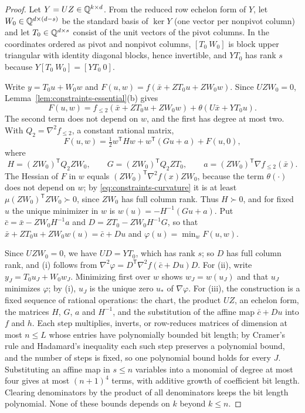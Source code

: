 \begin{proof}
Let $Y=UZ\in\mathbb Q^{k\times d}$. From the reduced row echelon form of $Y$, let
$W_0\in\mathbb Q^{d\times(d-s)}$ be the standard basis of $\ker Y$ (one vector per
nonpivot column) and let $T_0\in\mathbb Q^{d\times s}$ consist of the unit vectors of
the pivot columns. In the coordinates ordered as pivot and nonpivot columns,
$[T_0\ W_0]$ is block upper triangular with identity diagonal blocks, hence
invertible, and $YT_0$ has rank $s$ because $Y[T_0\ W_0]=[YT_0\ 0]$.

Write $y=T_0u+W_0w$ and $F(u,w)=f(\bar x+ZT_0u+ZW_0w)$. Since $UZW_0=0$,
Lemma~\ref{lem:constraints-essential}(b) gives
\[
 F(u,w)=f_{\le2}(\bar x+ZT_0u+ZW_0w)+\theta(U\bar x+YT_0u).
\]
The second term does not depend on $w$, and the first has degree at most two.
With $Q_2=\nabla^2f_{\le2}$, a constant rational matrix,
\[
 F(u,w)=\tfrac12w^{\mathsf T}Hw+w^{\mathsf T}(Gu+a)+F(u,0),
\]
where
\[
 H=(ZW_0)^{\mathsf T}Q_2ZW_0,\qquad G=(ZW_0)^{\mathsf T}Q_2ZT_0,\qquad
 a=(ZW_0)^{\mathsf T}\nabla f_{\le2}(\bar x).
\]
The Hessian of $F$ in $w$ equals $(ZW_0)^{\mathsf T}\nabla^2f(x)ZW_0$, because
the term $\theta(\cdot)$ does not depend on $w$; by
\eqref{eq:constraints-curvature} it is at least
$\mu(ZW_0)^{\mathsf T}ZW_0\succ0$, since $ZW_0$ has full column rank. Thus
$H\succ0$, and for fixed $u$ the unique minimizer in $w$ is
$w(u)=-H^{-1}(Gu+a)$. Put $\bar c=\bar x-ZW_0H^{-1}a$ and
$D=ZT_0-ZW_0H^{-1}G$, so that $\bar x+ZT_0u+ZW_0w(u)=\bar c+Du$ and
$\varphi(u)=\min_wF(u,w)$.

Since $UZW_0=0$, we have $UD=YT_0$, which has rank $s$; so $D$ has full
column rank, and (i) follows from
$\nabla^2\varphi=D^{\mathsf T}\nabla^2f(\bar c+Du)D$. For (ii), write
$y_J=T_0u_J+W_0w_J$. Minimizing first over $w$ shows $w_J=w(u_J)$ and that
$u_J$ minimizes $\varphi$; by (i), $u_J$ is the unique zero $u_*$ of
$\nabla\varphi$. For (iii), the construction is a fixed sequence of rational
operations: the chart, the product $UZ$, an echelon form, the matrices $H$,
$G$, $a$ and $H^{-1}$, and the substitution of the affine map $\bar c+Du$ into
$f$ and $h$. Each step multiplies, inverts, or row-reduces matrices of
dimension at most $n\le L$ whose entries have polynomially bounded bit length;
by Cramer's rule and Hadamard's inequality each such step preserves a
polynomial bound, and the number of steps is fixed, so one polynomial bound
holds for every $J$. Substituting an affine map in $s\le n$ variables into a
monomial of degree at most four gives at most $(n+1)^4$ terms, with additive
growth of coefficient bit length. Clearing denominators by the product of all
denominators keeps the bit length polynomial. None of these bounds depends on
$k$ beyond $k\le n$.
\end{proof}

